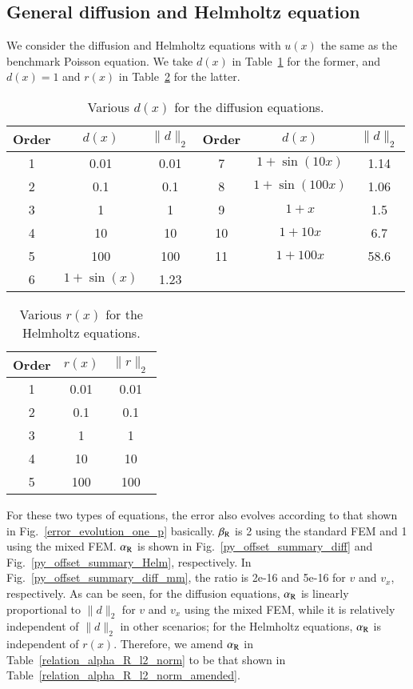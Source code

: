 \documentclass[review,3p]{elsarticle}
\begin{document}
\subsection{General diffusion and Helmholtz equation}	\label{section_d_and_r}

We consider the diffusion and Helmholtz equations with $u(x)$ the same as the benchmark Poisson equation. We take $d(x)$ in Table~\ref{d_diffusion_equations} for the former, and $d(x)=1$ and $r(x)$ in Table~\ref{r_Helmholtz_equations} for the latter. 


\begin{table}[!ht]
\centering
\caption [w]{Various $d(x)$ for the diffusion equations.} 
\label{d_diffusion_equations}
 \begin{tabular}{c c c c c c} \hline
Order &$d(x)$ & $\|d\|_2$ & Order &$d(x)$ & $\|d\|_2$ \\ \hline
1 & 0.01 & 0.01 & 7 & $1+\sin(10x)$ & 1.14 \\ \hline
2 & 0.1 & 0.1 & 8 & $1+\sin(100x)$ & 1.06 \\ \hline
3 & 1 & 1 & 9 & $1+x$ & 1.5 \\ \hline
4 & 10 & 10 & 10 & $1+10x$ & 6.7 \\ \hline
5 & 100 & 100 & 11& $1+100x$ & 58.6 \\ \hline
6 & $1+\sin(x)$ & 1.23 & & &  \\ \hline
\end{tabular}
\end{table}

\begin{table}[!ht]
\centering
\caption [w]{Various $r(x)$ for the Helmholtz equations.} 
\label{r_Helmholtz_equations}
 \begin{tabular}{c c c} \hline
Order & $r(x)$ & $\|r\|_2$ \\ \hline
1 & 0.01 & 0.01 \\ \hline
2 & 0.1 & 0.1 \\ \hline 
3 & 1 & 1 \\ \hline 
4 & 10 & 10 \\ \hline 
5 & 100 & 100 \\ \hline
\end{tabular}
\end{table}

For these two types of equations, the error also evolves according to that shown in Fig.~\ref{error_evolution_one_p} basically. $\beta_{\rm R}$ is 2 using the standard FEM and 1 using the mixed FEM. $\alpha_{\rm R}$ is shown in Fig.~\ref{py_offset_summary_diff} and Fig.~\ref{py_offset_summary_Helm}, respectively. In Fig.~\ref{py_offset_summary_diff_mm}, the ratio is 2e-16 and 5e-16 for $v$ and $v_x$, respectively. As can be seen, for the diffusion equations, $\alpha_{\rm R}$ is linearly proportional to $\|d\|_2$ for $v$ and $v_x$ using the mixed FEM, while it is relatively independent of $\|d\|_2$ in other scenarios; for the Helmholtz equations, $\alpha_{\rm R}$ is independent of $r(x)$. Therefore, we amend $\alpha_{\rm R}$ in Table~\ref{relation_alpha_R_l2_norm} to be that shown in Table~\ref{relation_alpha_R_l2_norm_amended}.
\end{document}
